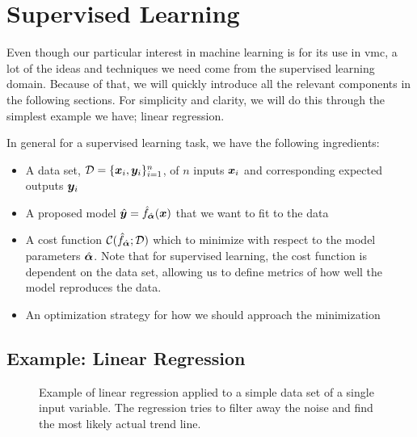 \documentclass[Thesis.tex]{subfiles}
\begin{document}
\section{Supervised Learning}

Even though our particular interest in machine learning is for its use in \gls{vmc}, a
lot of the ideas and techniques we need come from the supervised learning
domain. Because of that, we will quickly introduce all the relevant components in the
following sections. For simplicity and clarity, we will do this through the
simplest example we have; linear regression.

In general for a supervised learning task, we have the following ingredients:

\begin{itemize}
\item A data set, $\mathcal{D} = \{\bm{x}_i, \bm{y}_i\}_{i=1}^n$, of $n$ inputs $\bm{x}_i$
  and corresponding expected outputs $\bm{y}_i$
\item A proposed model $\hat{\bm{y}} = \hat f_{\hat{\bm{\alpha}}}(\bm{x})$ that we want to
    fit to the data
\item A cost function $\mathcal{C}(\hat f_{\hat{\bm{\alpha}}}; \mathcal{D})$ which
  to minimize with respect to the model parameters $\hat {\bm{\alpha}}$. Note that for
  supervised learning, the cost function is dependent on the data set, allowing
  us to define metrics of how well the model reproduces the data.
\item An optimization strategy for how we should approach the minimization
\end{itemize}


\subsection{Example: Linear Regression}

\begin{figure}[h]
  \centering
  \resizebox{0.7\linewidth}{!}{%
      
  }
  \caption[Example of linear regression]{Example of linear regression applied to a simple data set of a single
    input variable. The regression tries to filter away the noise and find the
    most likely actual trend line.}
  \label{fig:linear-regression-example}
\end{figure}
\end{document}

